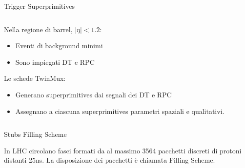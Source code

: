 \documentclass{beamer}
\begin{document}
\begin{frame}{Trigger Superprimitives}

\begin{columns}

    \begin{column}{0.5\textwidth}
    Nella regione di barrel, $|\eta| < 1.2$:
    \begin{itemize}
        \item Eventi di background minimi
        \item Sono impiegati DT e RPC
    \end{itemize}
    \vspace{0.5 cm}
    Le schede TwinMux:
    \begin{itemize}
        \item Generano superprimitives dai segnali dei DT e RPC
        \item Assegnano a ciascuna superprimitives parametri spaziali e qualitativi.
    \end{itemize}

    \end{column}
    \begin{column}{0.5\textwidth}
        \centering
    \end{column}
\end{columns}
    
\end{frame}



\begin{frame}{Stubs Filling Scheme}

In LHC circolano fasci formati da al massimo 3564 pacchetti discreti di protoni distanti 25ns. La disposizione dei pacchetti è chiamata Filling Scheme.

\vspace{0.8 cm}

\begin{columns}

    \begin{column}{0.5\textwidth}
    \end{column}
    \begin{column}{0.5\textwidth}
        \centering
    \end{column}
\end{columns}

\end{frame}
\end{document}
